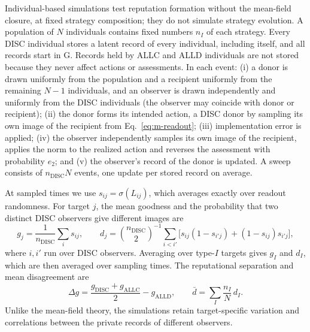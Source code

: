 Individual-based simulations test reputation formation without the mean-field
closure, at fixed strategy composition; they do not simulate strategy
evolution. A population of $N$ individuals contains fixed numbers $n_I$ of each
strategy. Every DISC individual stores a latent record of every individual,
including itself, and all records start in $\mathrm G$. Records held by ALLC and
ALLD individuals are not stored because they never affect actions or
assessments. In each event: (i) a donor is drawn uniformly from the population
and a recipient uniformly from the remaining $N-1$ individuals, and an observer
is drawn independently and uniformly from the DISC individuals (the observer
may coincide with donor or recipient); (ii) the donor forms its intended
action, a DISC donor by sampling its own image of the recipient from
Eq.~\eqref{eq:m-readout}; (iii) implementation error is applied; (iv) the
observer independently samples its own image of the recipient, applies the norm
to the realized action and reverses the assessment with probability $e_2$; and
(v) the observer's record of the donor is updated. A sweep consists of
$n_{\mathrm{DISC}}N$ events, one update per stored record on average.

At sampled times we use $s_{ij}=\sigma(L_{ij})$, which averages exactly over
readout randomness. For target $j$, the mean goodness and the probability that
two distinct DISC observers give different images are
\begin{equation}
g_j=\frac{1}{n_{\mathrm{DISC}}}\sum_i s_{ij},\qquad
d_j=\binom{n_{\mathrm{DISC}}}{2}^{-1}\sum_{i<i'}
\bigl[s_{ij}(1-s_{i'j})+(1-s_{ij})s_{i'j}\bigr],
\label{eq:m-finite-estimators}
\end{equation}
where $i,i'$ run over DISC observers. Averaging over type-$I$ targets gives
$g_I$ and $d_I$, which are then averaged over sampling times. The reputational
separation and mean disagreement are
\begin{equation}
\Delta g=\frac{g_{\mathrm{DISC}}+g_{\mathrm{ALLC}}}{2}-g_{\mathrm{ALLD}},
\qquad
\bar d=\sum_I\frac{n_I}{N}\,d_I .
\label{eq:m-recognition}
\end{equation}
Unlike the mean-field theory, the simulations retain target-specific variation
and correlations between the private records of different observers.

